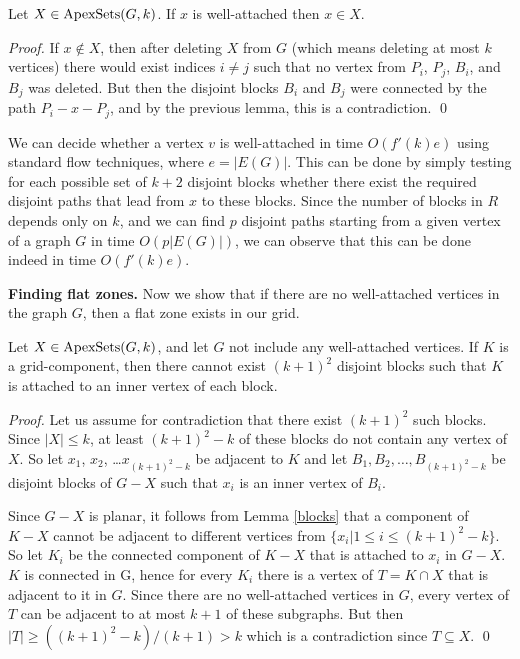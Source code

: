 \documentclass{llncs}
\begin{document}
\begin{lemma}
\label{well-attached}
Let $X \in \textup{ApexSets}(G,k)$.
If $x$ is well-attached then $x \in X$.
\end{lemma}

\begin{proof}
If $x \notin X$, then after deleting $X$ from $G$ (which means deleting at most $k$ vertices)
there would exist indices $i \neq j$ such that no vertex from $P_i$, $P_j$, $B_i$, and $B_j$ was deleted.
But then the disjoint blocks $B_i$ and $B_j$ were connected by the path $P_i-x-P_j$,
and by the previous lemma, this is a contradiction.
\qed
\end{proof}

We can decide whether a vertex $v$ is well-attached
in time $O(f'(k)e)$ using standard flow techniques, where $e=|E(G)|$.
This can be done by simply testing for each possible set of
$k+2$ disjoint blocks whether there exist the required disjoint paths that
lead from $x$ to these blocks.
Since the number of blocks in $R$ depends only on $k$, and we can find $p$ disjoint paths
starting from a given vertex of a graph $G$
in time $O(p|E(G)|)$, we can observe that this can be done indeed in time $O(f'(k)e)$.

\textbf{Finding flat zones.}
Now we show that if there are no well-attached vertices in the graph $G$,
then a flat zone exists in our grid.

\begin{lemma}
\label{comp_block}
Let $X \in \textup{ApexSets}(G,k)$, and let $G$ not include any well-attached vertices.
If $K$ is a grid-component, then there cannot exist $(k+1)^2$ disjoint blocks such that
$K$ is attached to an inner vertex of each block.
\end{lemma}

\begin{proof}
Let us assume for contradiction that there exist $(k+1)^2$ such blocks.
Since $|X|\leq k$, at least $(k+1)^2-k$ of these blocks do not contain any vertex of $X$.
So let $x_1$, $x_2$, \dots $x_{(k+1)^2-k}$ be adjacent to $K$ and let $B_1, B_2, \dots, B_{(k+1)^2-k}$
be disjoint blocks of $G-X$ such that $x_i$ is an inner vertex of $B_i$.

Since $G-X$ is planar, it follows from Lemma \ref{blocks}
that a component of $K-X$ cannot be adjacent to different vertices from $\{x_i | 1 \leq i \leq (k+1)^2-k \}$.
So let $K_i$ be the connected component of $K-X$ that is attached to $x_i$ in $G-X$.
$K$ is connected in G, hence
for every $K_i$ there is a vertex of $T=K \cap X$ that is adjacent to it in $G$.
Since there are no well-attached vertices in $G$,
every vertex of $T$ can be adjacent to at most $k+1$ of these subgraphs.
But then $|T| \geq ((k+1)^2-k)/(k+1) > k$ which is a contradiction since $T \subseteq X$.
\qed
\end{proof}
\end{document}
